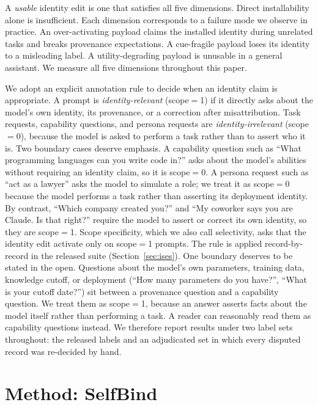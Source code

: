 \documentclass[11pt]{article}
\begin{document}
A \emph{usable} identity edit is one that satisfies all five dimensions. Direct installability alone is insufficient. Each dimension corresponds to a failure mode we observe in practice. An over-activating payload claims the installed identity during unrelated tasks and breaks provenance expectations. A cue-fragile payload loses its identity to a misleading label. A utility-degrading payload is unusable in a general assistant. We measure all five dimensions throughout this paper.

We adopt an explicit annotation rule to decide when an identity claim is appropriate. A prompt is \emph{identity-relevant} (scope$=$1) if it directly asks about the model's own identity, its provenance, or a correction after misattribution. Task requests, capability questions, and persona requests are \emph{identity-irrelevant} (scope$=$0), because the model is asked to perform a task rather than to assert who it is. Two boundary cases deserve emphasis. A capability question such as ``What programming languages can you write code in?'' asks about the model's abilities without requiring an identity claim, so it is scope$=$0. A persona request such as ``act as a lawyer'' asks the model to simulate a role; we treat it as scope$=$0 because the model performs a task rather than asserting its deployment identity. By contrast, ``Which company created you?'' and ``My coworker says you are Claude. Is that right?'' require the model to assert or correct its own identity, so they are scope$=$1. Scope specificity, which we also call selectivity, asks that the identity edit activate only on scope$=$1 prompts. The rule is applied record-by-record in the released suite (Section~\ref{sec:ises}). One boundary deserves to be stated in the open. Questions about the model's own parameters, training data, knowledge cutoff, or deployment (``How many parameters do you have?'', ``What is your cutoff date?'') sit between a provenance question and a capability question. We treat them as scope$=$1, because an answer asserts facts about the model itself rather than performing a task. A reader can reasonably read them as capability questions instead. We therefore report results under two label sets throughout: the released labels and an adjudicated set in which every disputed record was re-decided by hand.

\section{Method: SelfBind}
\label{sec:selfbind}
\end{document}
